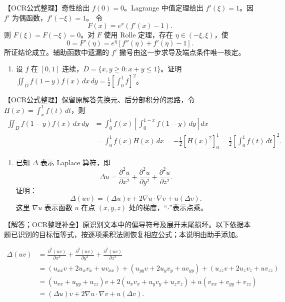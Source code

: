 \documentclass[11pt,fontset=fandol]{ctexart}
\providecommand{\tightlist}{\setlength{\itemsep}{0pt}\setlength{\parskip}{0pt}}
\begin{document}
【OCR公式整理】奇性给出 \(f(0)=0\)。Lagrange 中值定理给出
\(f'(\xi)=1\)。因 \(f'\) 为偶函数，\(f'(-\xi)=1\)。 令 \[
F(x)=e^x(f'(x)-1).
\] 则 \(F(\xi)=F(-\xi)=0\)。对 \(F\) 使用 Rolle 定理，存在
\(\eta\in(-\xi,\xi)\)，使 \[
0=F'(\eta)=e^\eta[f''(\eta)+f'(\eta)-1].
\] 所证结论成立。辅助函数中遗漏的 \(f'\)
撇号由这一步求导及端点条件唯一核定。

\begin{enumerate}
\def\labelenumi{\arabic{enumi}.}
\setcounter{enumi}{2}
\tightlist
\item
  设 \(f\) 在 \([0,1]\) 连续，\(D=\{x,y\ge0:x+y\le1\}\)。证明
  \(\iint_Df(1-y)f(x)\,dx\,dy=\frac12[\int_0^1f]^2\)。
\end{enumerate}

【OCR公式整理】保留原解答先换元、后分部积分的思路，令
\(H(x)=\int_x^1f(t)\,dt\)，则 \[
\begin{aligned}
\iint_Df(1-y)f(x)\,dx\,dy
&=\int_0^1 f(x)\left[\int_0^{1-x}f(1-y)\,dy\right]dx\\
&=\int_0^1f(x)H(x)\,dx
=-\frac12[H(x)^2]_0^1
=\frac12\left[\int_0^1f(t)\,dt\right]^2.
\end{aligned}
\]

\begin{enumerate}
\def\labelenumi{\arabic{enumi}.}
\setcounter{enumi}{3}
\tightlist
\item
  已知 \(\Delta\) 表示 Laplace 算符，即 \[
  \Delta u=\frac{\partial^2u}{\partial x^2}+
  \frac{\partial^2u}{\partial y^2}+
  \frac{\partial^2u}{\partial z^2}.
  \] 证明： \[
  \Delta(uv)=(\Delta u)v+2\nabla u\cdot\nabla v+u(\Delta v).
  \] 这里 \(\nabla u\) 表示函数 \(u\) 在点 \((x,y,z)\)
  处的梯度，``\(\cdot\)''表示点乘。
\end{enumerate}

【解答；OCR整理补全】原识别文本中的偏导符号及展开末尾损坏。以下依据本题已识别的目标恒等式，按逐项乘积法则恢复相应公式；本说明由助手添加。

\[
\begin{aligned}
\Delta(uv)
&=\frac{\partial^2(uv)}{\partial x^2}
+\frac{\partial^2(uv)}{\partial y^2}
+\frac{\partial^2(uv)}{\partial z^2}\\
&=(u_{xx}v+2u_xv_x+uv_{xx})
 +(u_{yy}v+2u_yv_y+uv_{yy})
 +(u_{zz}v+2u_zv_z+uv_{zz})\\
&=(u_{xx}+u_{yy}+u_{zz})v
 +2(u_xv_x+u_yv_y+u_zv_z)
 +u(v_{xx}+v_{yy}+v_{zz})\\
&=(\Delta u)v+2\nabla u\cdot\nabla v+u(\Delta v).
\end{aligned}
\]
\end{document}

